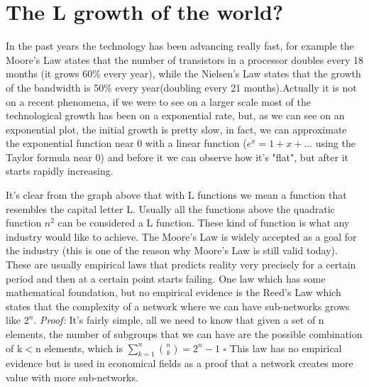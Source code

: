 \documentclass[12pt, a4page]{article}
\begin{document}
\part*{The L growth of the world?}
In the past years the technology has been advancing really fast, for example the Moore's Law states that the number of transistors in a processor doubles every 18 months (it grows 60\% every year), while the Nielsen's Law states that the growth of the bandwidth is 50\% every year(doubling every 21 months)\cite{Floridi}.Actually it is not on a recent phenomena, if we were to see on a larger scale most of the technological growth has been on a exponential rate, but, as we can see on an exponential plot, the initial growth is pretty slow, in fact, we can approximate the exponential function near 0 with a linear function ($e^x = 1 + x + ...$ using the Taylor formula near 0) and before it we can observe how it's "flat", but after it starts rapidly increasing.
\newline
{}
\newline
It's clear from the graph above that with L functions we mean a function that resembles the capital letter L. Usually all the functions above the quadratic function $n^2$ can be considered a L function. These kind of function is what any industry would like to achieve. The Moore's Law is widely accepted as a goal for the industry (this is one of the reason why Moore's Law is still valid today). These are usually empirical laws that predicts reality very precisely for a certain period and then at a certain point starts failing.\newline
One law which has some mathematical foundation, but no empirical evidence is the Reed's Law which states that the complexity of a network where we can have sub-networks grows like $2^n$. \newline
\textit{Proof:} It's fairly simple, all we need to know that given a set of n elements, the number of subgroups that we can have are the possible combination of k$<$n elements, which is $\sum_{k=1}^n {n \choose k} = 2^n -1$ \hfill $\square$ \newline 
This law has no empirical evidence but is used in economical fields as a proof that a network creates  more value with more sub-networks. \newline
\end{document}
